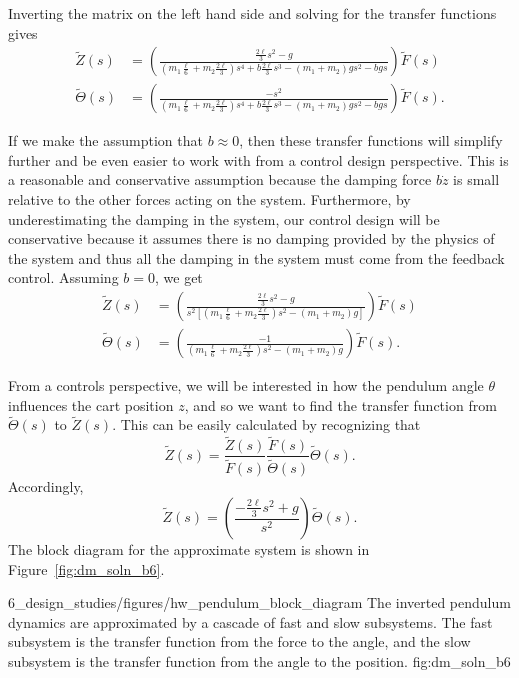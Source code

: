 %
Inverting the matrix on the left hand side and solving for the transfer functions gives
\begin{align*}
\tilde{Z}(s) &= \left(\frac{ \frac{2 \ell}{3} s^2 - g}{(m_1 \frac{\ell}{6}+ m_2 \frac{2 \ell}{3}) s^4 +b\frac{2\ell}{3} s^3 -(m_1+m_2)gs^2-bgs}\right) \tilde{F}(s) \\
\tilde{\Theta}(s) &= \left(\frac{-s^2}{(m_1 \frac{\ell}{6}+ m_2 \frac{2 \ell}{3}) s^4 +b\frac{2\ell}{3} s^3 -(m_1+m_2)gs^2-bgs}\right) \tilde{F}(s).
\end{align*}

If we make the assumption that $b \approx 0$, then these transfer functions will simplify further and be even easier to work with from a control design perspective. This is a reasonable and conservative assumption because the damping force $b\dot{z}$ is small relative to the other forces acting on the system. Furthermore, by underestimating the damping in the system, our control design will be conservative because it assumes there is no damping provided by the physics of the system and thus all the damping in the system must come from the feedback control.
%
Assuming $b=0$, we get
\begin{align*}
\tilde{Z}(s) &= \left(\frac{\frac{2 \ell}{3} s^2 - g}{s^2\left[(m_1 \frac{\ell}{6}+ m_2 \frac{2 \ell}{3}) s^2  -(m_1+m_2)g \right]}\right) \tilde{F}(s) \\
\tilde{\Theta}(s) &= \left(\frac{-1}{(m_1 \frac{\ell}{6}+ m_2 \frac{2 \ell}{3}) s^2  -(m_1+m_2)g}\right) \tilde{F}(s).
\end{align*}

From a controls perspective, we will be interested in how the pendulum angle $\theta$ influences the cart position $z$, and so we want to find the transfer function from $\tilde{\Theta}(s)$ to $\tilde{Z}(s)$. This can be easily calculated by recognizing that
\[
\tilde{Z}(s) = \frac{\tilde{Z}(s)}{\tilde{F}(s)}\frac{\tilde{F}(s)}{\tilde{\Theta}(s)} \tilde{\Theta}(s).
\]
Accordingly, 
\[
\tilde{Z}(s) = \left(\frac{-\frac{2 \ell}{3} s^2 + g}{s^2} \right) \tilde{\Theta}(s).
\]
%
The block diagram for the approximate system is shown in Figure~\ref{fig:dm_soln_b6}.

	{6_design_studies/figures/hw_pendulum_block_diagram}
	{The inverted pendulum dynamics are approximated by a cascade of fast and slow subsystems.  The fast subsystem is the transfer function from the force to the angle, and the slow subsystem is the transfer function from the angle to the position.}
	{fig:dm_soln_b6}

